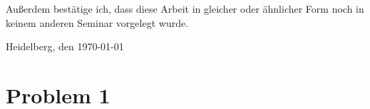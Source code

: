 \documentclass[
     11pt,         %
     a4paper,      %
     oneside,
     ]{article}
\begin{document}
Außerdem bestätige ich, dass diese Arbeit in gleicher oder ähnlicher Form noch in keinem anderen Seminar vorgelegt wurde.
\vspace*{50pt}

Heidelberg, den \today \hspace{2cm} \underline{\phantom{Platz für die Unterschrift}}
\newpage



\tableofcontents
\newpage





\section{Problem 1}\label{sec:problem1}
\end{document}
